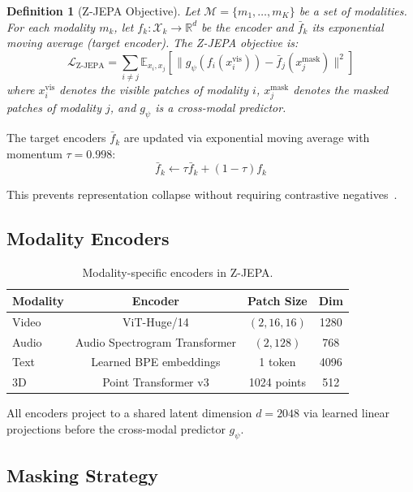 \documentclass[11pt,letterpaper]{article}
\newtheorem{definition}{Definition}[section]
\newcommand{\R}{\mathbb{R}}
\newcommand{\E}{\mathbb{E}}
\begin{document}
\begin{definition}[Z-JEPA Objective]
Let $\mathcal{M} = \{m_1, \ldots, m_K\}$ be a set of modalities. For each modality $m_k$, let $f_k: \mathcal{X}_k \to \R^d$ be the encoder and $\bar{f}_k$ its exponential moving average (target encoder). The Z-JEPA objective is:
\begin{equation}
\mathcal{L}_{\text{Z-JEPA}} = \sum_{i \neq j} \E_{x_i, x_j} \left[ \| g_\psi(f_i(x_i^{\text{vis}})) - \bar{f}_j(x_j^{\text{mask}}) \|^2 \right]
\label{eq:zjepa}
\end{equation}
where $x_i^{\text{vis}}$ denotes the visible patches of modality $i$, $x_j^{\text{mask}}$ denotes the masked patches of modality $j$, and $g_\psi$ is a cross-modal predictor.
\end{definition}

The target encoders $\bar{f}_k$ are updated via exponential moving average with momentum $\tau = 0.998$:
\[
\bar{f}_k \leftarrow \tau \bar{f}_k + (1 - \tau) f_k
\]

This prevents representation collapse without requiring contrastive negatives~\cite{grill2020bootstrap}.

\subsection{Modality Encoders}

\begin{table}[t]
\centering
\begin{tabular}{lccc}
\toprule
\textbf{Modality} & \textbf{Encoder} & \textbf{Patch Size} & \textbf{Dim} \\
\midrule
Video & ViT-Huge/14 & $(2, 16, 16)$ & 1280 \\
Audio & Audio Spectrogram Transformer & $(2, 128)$ & 768 \\
Text & Learned BPE embeddings & 1 token & 4096 \\
3D & Point Transformer v3 & 1024 points & 512 \\
\bottomrule
\end{tabular}
\caption{Modality-specific encoders in Z-JEPA.}
\label{tab:encoders}
\end{table}

All encoders project to a shared latent dimension $d = 2048$ via learned linear projections before the cross-modal predictor $g_\psi$.

\subsection{Masking Strategy}
\end{document}
